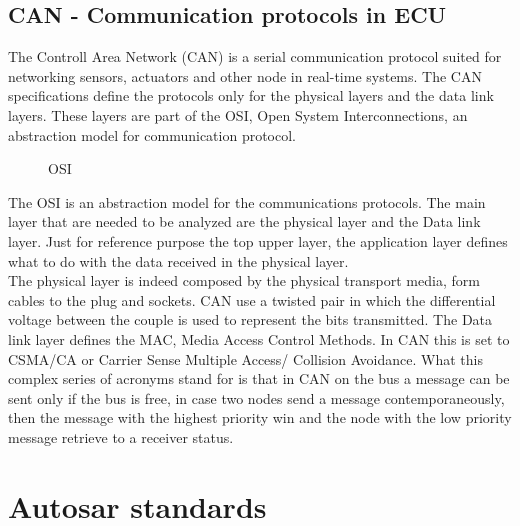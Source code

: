 \documentclass[../main.tex]{subfiles}
\begin{document}
\subsection{CAN - Communication protocols in ECU}
The Controll Area Network (CAN) is a serial communication protocol suited for networking sensors, actuators and other node in real-time systems. The CAN specifications define the protocols only for the physical layers and the data link layers. These layers are part of the OSI, Open System Interconnections, an abstraction model for communication protocol. 
\begin{figure}[h]
    \centering
{}
    \caption{OSI}
    \label{fig:ECUstructure}
\end{figure}
The OSI is an abstraction model for the communications protocols. The main layer that are needed to be analyzed are the physical layer and the Data link layer. Just for reference purpose the top upper layer, the application layer defines what to do with the data received in the physical layer.\\
The physical layer is indeed composed by the physical transport media, form cables to the plug and sockets. CAN use a twisted pair in which the differential voltage between the couple is used to represent the bits transmitted. The Data link layer defines the MAC, Media Access Control Methods. In CAN this is set to CSMA/CA or Carrier Sense Multiple Access/ Collision Avoidance. What this complex series of acronyms stand for is that in CAN on the bus a message can be sent only if the bus is free, in case two nodes send a message contemporaneously, then the message with the highest priority win and the node with the low priority message retrieve to a receiver status. 
\section{Autosar standards}

\cleardoublepage
\end{document}
